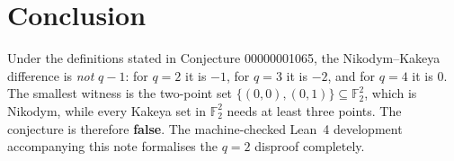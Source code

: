 \documentclass[11pt]{article}
\theoremstyle{definition}
\theoremstyle{remark}
\begin{document}
\section{Conclusion}

Under the definitions stated in Conjecture 00000001065, the Nikodym--Kakeya
difference is \emph{not} $q-1$: for $q=2$ it is $-1$, for $q=3$ it is $-2$,
and for $q=4$ it is $0$. The smallest witness is the two-point set
$\{(0,0),(0,1)\}\subseteq\mathbb{F}_2^2$, which is Nikodym, while every Kakeya
set in $\mathbb{F}_2^2$ needs at least three points. The conjecture is
therefore \textbf{false}. The machine-checked Lean~4 development accompanying
this note formalises the $q=2$ disproof completely.
\end{document}
